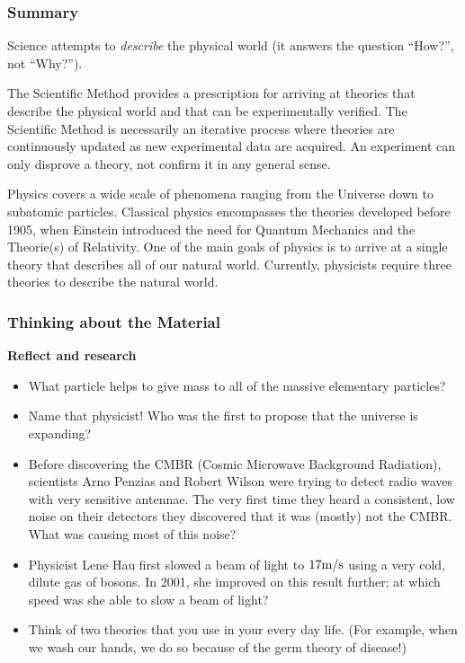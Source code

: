 \subsubsection{Summary}

Science attempts to \textit{describe} the physical world (it answers the question ``How?'', not ``Why?'').

The Scientific Method provides a prescription for arriving at theories that describe the physical world and that can be experimentally verified. The Scientific Method is necessarily an iterative process where theories are continuously updated as new experimental data are acquired. An experiment can only disprove a theory, not confirm it in any general sense.

Physics covers a wide scale of phenomena ranging from the Universe down to subatomic particles. Classical physics encompasses the theories developed before 1905, when Einstein introduced the need for Quantum Mechanics and the Theorie(s) of Relativity. One of the main goals of physics is to arrive at a single theory that describes all of our natural world. Currently, physicists require three theories to describe the natural world.

\subsubsection{Thinking about the Material}

\begin{framed}
\textbf{Reflect and research}\\
\begin{itemize}
\item What particle helps to give mass to all of the massive elementary particles?
\item Name that physicist! Who was the first to propose that the universe is expanding?
\item Before discovering the CMBR (Cosmic Microwave Background Radiation), scientists Arno Penzias and Robert Wilson were trying to detect radio waves with very sensitive antennae. The very first time they heard a consistent, low noise on their detectors they discovered that it was (mostly) not the CMBR. What was causing most of this noise?
\item Physicist Lene Hau first slowed a beam of light to $17 {\rm m/s}$ using a very cold, dilute gas of bosons. In 2001, she improved on this result further; at which speed was she able to slow a beam of light?
\item Think of two theories that you use in your every day life. (For example, when we wash our hands, we do so because of the germ theory of disease!)
\end{itemize}
\end{framed}

